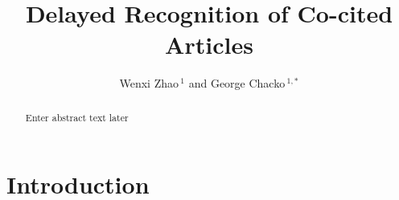 \documentclass[utf8]{frontiersSCNS}
\def\firstAuthorLast{Zhao {et~al.}} %
\def\Authors{Wenxi Zhao\,$^{1}$ and George Chacko\,$^{1,*}$} %
\begin{document}
\onecolumn
{}

\title[Delayed Co-citations]{Delayed Recognition of Co-cited Articles} 

\author[\firstAuthorLast ]{\Authors} %
\address{} %
\correspondance{} %

\extraAuth{}%

\maketitle

\begin{abstract}
Enter abstract text later
\end{abstract}

\section{Introduction}
\end{document}
